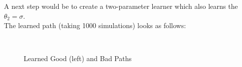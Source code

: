\documentclass[]{amsart}
\begin{document}
A next step would be to create a two-parameter learner which also learns the $\theta_2 = \sigma$.\\

The learned path (taking 1000 simulations) looks as follows:
\begin{figure}[ht!]
  \centering
     \\
  \caption{Learned Good (left) and Bad Paths}
\end{figure}
\end{document}
